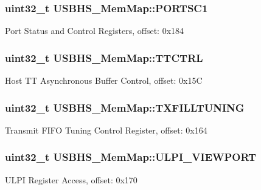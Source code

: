 \subsubsection[{P\+O\+R\+T\+S\+C1}]{\setlength{\rightskip}{0pt plus 5cm}uint32\+\_\+t U\+S\+B\+H\+S\+\_\+\+Mem\+Map\+::\+P\+O\+R\+T\+S\+C1}\label{struct_u_s_b_h_s___mem_map_ab9d19f0a7d75a0719e21dec6c883577e}
Port Status and Control Registers, offset\+: 0x184 \hypertarget{struct_u_s_b_h_s___mem_map_ab6b71bd9352f7fd35f0a435d5a7865f5}{}
\subsubsection[{T\+T\+C\+T\+R\+L}]{\setlength{\rightskip}{0pt plus 5cm}uint32\+\_\+t U\+S\+B\+H\+S\+\_\+\+Mem\+Map\+::\+T\+T\+C\+T\+R\+L}\label{struct_u_s_b_h_s___mem_map_ab6b71bd9352f7fd35f0a435d5a7865f5}
Host T\+T Asynchronous Buffer Control, offset\+: 0x15\+C \hypertarget{struct_u_s_b_h_s___mem_map_a4ed32f4e5db7b0ebe39bd635b26f0707}{}
\subsubsection[{T\+X\+F\+I\+L\+L\+T\+U\+N\+I\+N\+G}]{\setlength{\rightskip}{0pt plus 5cm}uint32\+\_\+t U\+S\+B\+H\+S\+\_\+\+Mem\+Map\+::\+T\+X\+F\+I\+L\+L\+T\+U\+N\+I\+N\+G}\label{struct_u_s_b_h_s___mem_map_a4ed32f4e5db7b0ebe39bd635b26f0707}
Transmit F\+I\+F\+O Tuning Control Register, offset\+: 0x164 \hypertarget{struct_u_s_b_h_s___mem_map_ab75bbe78d1737fdbb0e5aefb2a169acc}{}
\subsubsection[{U\+L\+P\+I\+\_\+\+V\+I\+E\+W\+P\+O\+R\+T}]{\setlength{\rightskip}{0pt plus 5cm}uint32\+\_\+t U\+S\+B\+H\+S\+\_\+\+Mem\+Map\+::\+U\+L\+P\+I\+\_\+\+V\+I\+E\+W\+P\+O\+R\+T}\label{struct_u_s_b_h_s___mem_map_ab75bbe78d1737fdbb0e5aefb2a169acc}
U\+L\+P\+I Register Access, offset\+: 0x170 \hypertarget{struct_u_s_b_h_s___mem_map_a17e03138a07af56c6f742f0140fff491}{}

